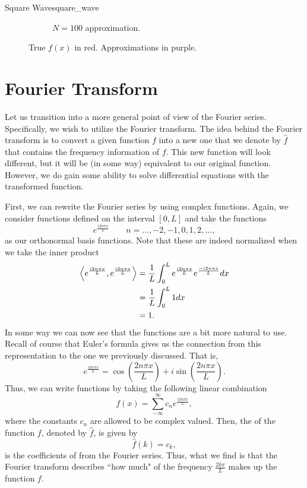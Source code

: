 \begin{ex}{Square Wave}{square_wave}
\begin{figure}[H]
\begin{subfigure}[h]{0.3\textwidth}
				\caption{$N=100$ approximation.}
			\end{subfigure}
		\caption{True $f(x)$ in red. Approximations in purple.}
		\end{figure}
\end{ex}

\section{Fourier Transform}

Let us transition into a more general point of view of the Fourier series.  Specifically, we wish to utilize the Fourier transform.  The idea behind the Fourier transform is to convert a given function $f$ into a new one that we denote by $\hat{f}$ that contains the frequency information of $f$.  This new function will look different, but it will be (in some way) equivalent to our original function. However, we do gain some ability to solve differential equations with the transformed function. 

First, we can rewrite the Fourier series by using complex functions.  Again, we consider functions defined on the interval $[0,L]$ and take the functions
\[
e^{\frac{i 2n \pi x}{L}} \qquad n=\dots, -2,-1,0,1,2,\dots,
\]
as our orthonormal basis functions.  Note that these are indeed normalized when we take the inner product
\begin{align*}
\left\langle e^{\frac{i 2n \pi x}{L}}, e^{\frac{i 2n \pi x}{L}} \right\rangle &= \frac{1}{L} \int_0^Le^{\frac{i 2n \pi x}{L}}e^{\frac{-i 2n \pi x}{L}}dx\\
&= \frac{1}{L}\int_0^L 1 dx\\
&= 1.
\end{align*}
In some way we can now see that the functions are a bit more natural to use.  Recall of course that Euler's formula gives us the connection from this representation to the one we previously discussed. That is,
\[
e^{\frac{i 2n \pi x}{L}} = \cos\left(\frac{2n \pi x}{L}\right) + i \sin\left(\frac{2 n \pi x}{L} \right).
\]
Thus, we can write functions by taking the following linear combination
\[
f(x) = \sum_{-\infty}^\infty c_n e^{\frac{i 2n \pi x}{L}},
\]
where the constants $c_n$ are allowed to be complex valued.  Then, the  of the function $f$, denoted by $\hat{f}$, is given by
\[
\hat{f}(k) = c_k,
\]
is the coefficients of from the Fourier series.  Thus, what we find is that the Fourier transform describes ``how much" of the frequency $\frac{2 k \pi}{L}$ makes up the function $f$.

